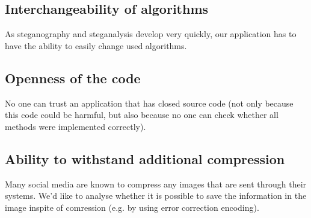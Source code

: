 \subsection{Interchangeability of algorithms}
As steganography and steganalysis develop very quickly, our application
has to have the ability to easily change used algorithms.  

\subsection{Openness of the code}
No one can trust an application that has closed source code (not only because
this code could be harmful, but also because no one can check whether all
methods were implemented correctly).

\subsection{Ability to withstand additional compression}
Many social media are known to compress any images that are sent through
their systems. We'd like to analyse whether it is possible to save the information
in the image inspite of comression (e.g. by using error correction encoding).

